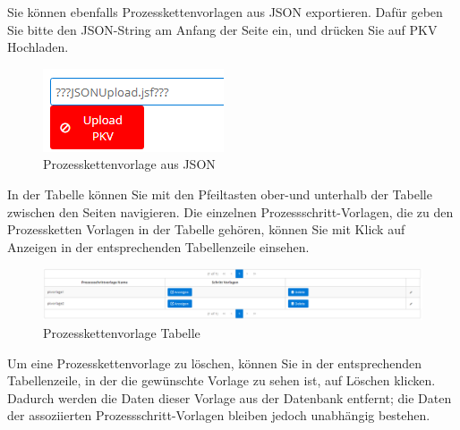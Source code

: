 \documentclass[enabledeprecatedfontcommands,fontsize=12pt,paper=a4,twoside]{scrartcl}
\begin{document}
Sie können ebenfalls Prozesskettenvorlagen aus JSON exportieren. Dafür geben Sie bitte den JSON-String am Anfang der Seite ein, und drücken Sie auf PKV Hochladen. \\

\begin{figure}[h!]
\begin{center}
 \includegraphics[width=\textwidth]{screenshots/pk/prozesskettenvorlagejson.png}
  \caption{Prozesskettenvorlage aus JSON}
  \label{fig:boat2}
\end{center}
\end{figure}

In der Tabelle können Sie mit den Pfeiltasten ober-und unterhalb der Tabelle zwischen den Seiten navigieren. Die einzelnen Prozessschritt-Vorlagen, die zu den Prozessketten Vorlagen in der Tabelle gehören, können Sie mit Klick auf Anzeigen in der entsprechenden Tabellenzeile einsehen. \\

\begin{figure}[h!]
\begin{center}
 \includegraphics[width=\textwidth]{screenshots/pk/prozesskettenvorlagetabelle.png}
  \caption{Prozesskettenvorlage Tabelle}
  \label{fig:boat2}
\end{center}
\end{figure}

Um eine Prozesskettenvorlage zu löschen, können Sie in der entsprechenden Tabellenzeile, in der die gewünschte Vorlage zu sehen ist, auf Löschen klicken. Dadurch werden die Daten dieser Vorlage aus der Datenbank entfernt; die Daten der assoziierten Prozessschritt-Vorlagen bleiben jedoch unabhängig bestehen. \\
\end{document}
